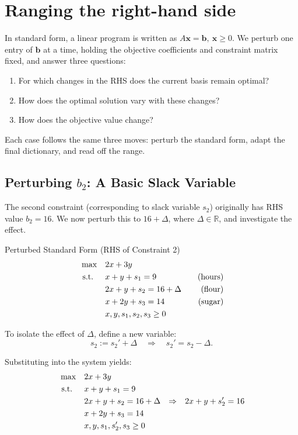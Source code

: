 \section{Ranging the right-hand side}
\label{sec:sensitivity-rhs}

In standard form, a linear program is written as \( A\mathbf{x} = \mathbf{b}, \ \mathbf{x} \geq 0 \). We perturb one entry of \( \mathbf{b} \) at a time, holding the objective coefficients and constraint matrix fixed, and answer three questions:
\begin{enumerate}
    \item For which changes in the RHS does the current basis remain optimal?
    \item How does the optimal solution vary with these changes?
    \item How does the objective value change?
\end{enumerate}
Each case follows the same three moves: perturb the standard form, adapt the final dictionary, and read off the range.

\subsection{Perturbing \( b_2 \): A Basic Slack Variable}

The second constraint (corresponding to slack variable \( s_2 \)) originally has RHS value \( b_2 = 16 \). We now perturb this to \( 16 + \Delta \), where \( \Delta \in \mathbb{R} \), and investigate the effect.

\begin{sensdisplay}{Perturbed Standard Form (RHS of Constraint 2)}
\[
\begin{aligned}
\max \quad & 2x + 3y \\
\text{ s.t. } \quad
& x + y + s_1 = 9 \quad & \text{(hours)} \\
& 2x + y + s_2 = 16 + \Delta \quad & \text{(flour)} \\
& x + 2y + s_3 = 14 \quad & \text{(sugar)} \\
& x, y, s_1, s_2, s_3 \geq 0
\end{aligned}
\]

To isolate the effect of \( \Delta \), define a new variable:
\[
s_2:= s_2' + \Delta \quad \Rightarrow \quad s_2' = s_2 - \Delta.
\]

Substituting into the system yields:
\[
\begin{aligned}
\max \quad & 2x + 3y \\
\text{ s.t. } \quad
& x + y + s_1 = 9 \\
& 2x + y + s_2= 16 + \Delta  & \Rightarrow &&  2x + y + s_2'= 16\\
& x + 2y + s_3 = 14 \\
& x, y, s_1, s_2', s_3 \geq 0
\end{aligned}
\]
\end{sensdisplay}

